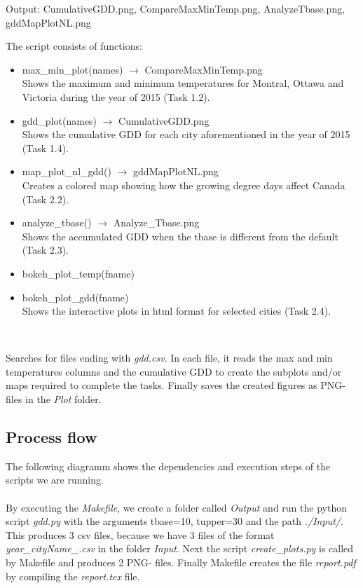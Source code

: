 \documentclass[12pt]{article}
\begin{document}
\begin{description}
\item[create\_plots.py]
\item Output: CumulativeGDD.png, CompareMaxMinTemp.png, AnalyzeTbase.png, gddMapPlotNL.png
\item The script consists of functions:
\begin{itemize}
\item max\_min\_plot(names) $\to$ CompareMaxMinTemp.png \\
Shows the maximum and minimum temperatures for Montral, Ottawa and Victoria during the year of 2015 (Task 1.2).
\item gdd\_plot(names)  $\to$ CumulativeGDD.png \\
Shows the cumulative GDD for each city aforementioned in the year of 2015 (Task 1.4).
\item map\_plot\_nl\_gdd()  $\to$  gddMapPlotNL.png \\
Creates a colored map showing how the growing degree days affect Canada (Task 2.2).
\item analyze\_tbase()  $\to$ Analyze_Tbase.png \\
Shows the accumulated GDD when the tbase is different from the default (Task 2.3).
\item bokeh\_plot\_temp(fname)  
\item bokeh\_plot\_gdd(fname) \\
Shows the interactive plots in html format for selected cities (Task 2.4).
\end{itemize} \\
\item Searches for files ending with \emph{gdd.csv}. 
In each file, it reads the max and min temperatures columns and the cumulative GDD to create the subplots and/or maps required to complete the tasks. Finally saves the created figures as PNG-files in the \emph{Plot} folder.

\end{description}
\subsection{Process flow}
The following diagramm shows the dependencies and execution steps of the scripts
we are running.
\\~\\
By executing the \emph{Makefile}, we create a folder called \emph{Output} and run
the python script \emph{gdd.py} with the arguments tbase=10, tupper=30 and the path
 \emph{./Input/}. This produces 3 csv files, because we have 3 files of the 
format \emph{year\_cityName\_.csv} in the folder \emph{Input}.
Next the script \emph{create\_plots.py} is called by Makefile and produces 2 PNG-
files. Finally Makefile creates the file \emph{report.pdf} by compiling the 
\emph{report.tex} file.
\end{document}
